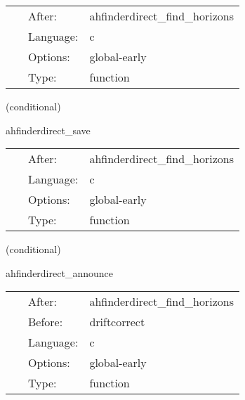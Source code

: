 \hspace{5mm}

 \begin{tabular*}{160mm}{cll} 
~ & After:  & ahfinderdirect\_find\_horizons \\ 
~ & Language:  & c \\ 
~ & Options:  & global-early \\ 
~ & Type:  & function \\ 
\end{tabular*} 


\vspace{5mm}

   (conditional) 

\hspace{5mm} ahfinderdirect\_save 

\hspace{5mm}{\it save apparent horizon(s) into cactus variables } 


\hspace{5mm}

 \begin{tabular*}{160mm}{cll} 
~ & After:  & ahfinderdirect\_find\_horizons \\ 
~ & Language:  & c \\ 
~ & Options:  & global-early \\ 
~ & Type:  & function \\ 
\end{tabular*} 


\vspace{5mm}

   (conditional) 

\hspace{5mm} ahfinderdirect\_announce 

\hspace{5mm}{\it announce horizon position(s) to other thorns } 


\hspace{5mm}

 \begin{tabular*}{160mm}{cll} 
~ & After:  & ahfinderdirect\_find\_horizons \\ 
~ & Before:  & driftcorrect \\ 
~ & Language:  & c \\ 
~ & Options:  & global-early \\ 
~ & Type:  & function \\ 
\end{tabular*} 


